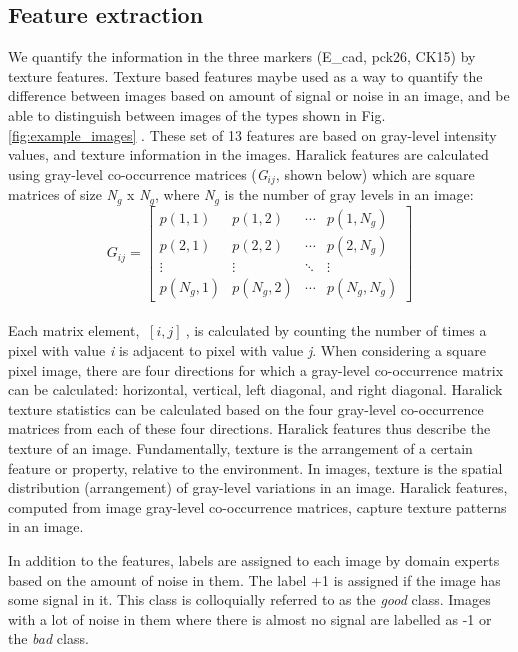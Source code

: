 \subsection{Feature extraction}

We quantify the information in the three markers (E\_cad, pck26, CK15) by texture features. Texture based features maybe used as a way to quantify the difference between images based on amount of signal or noise in an image, and be able to distinguish between images of the types shown in Fig. \ref{fig:example_images} .  These set of 13 features are based on gray-level intensity values, and texture information \cite{haralick1979statistical, haralick1973textural} in the images. 
Haralick features \cite{Haralick1973} are calculated using gray-level co-occurrence matrices (\textit{G$_{ij}$}, shown below) which are square matrices of size \textit{N$_g$} x \textit{N$_g$}, where \textit{N$_g$} is the number of gray levels in an image:
\\
\begin{equation}
G_{ij}=
  \begin{bmatrix}
    p(1,1) & p(1,2) & \cdots       & p(1,N_{g}) \\
    p(2,1) & p(2,2) &  \cdots      & p(2,N_{g}) \\
     \vdots &  \vdots &  \ddots    &  \vdots          \\
    p(N_{g},1)  & p(N_{g},2) & \cdots & p(N_{g},N_{g}) 
  \end{bmatrix}
\end{equation}
\\
Each matrix element, $ \ [i,j]\ $, is calculated by counting the number of times a pixel with value \textit{i} is adjacent to pixel with value \textit{j}.  When considering a square pixel image, there are four directions for which a gray-level co-occurrence matrix can be calculated: horizontal, vertical, left diagonal, and right diagonal.  Haralick texture statistics can be calculated based on the four gray-level co-occurrence matrices from each of these four directions. Haralick features thus describe the texture of an image. Fundamentally, texture is the arrangement of a certain feature or property, relative to the environment. In images, texture is the spatial distribution (arrangement) of gray-level variations in an image. Haralick features, computed from image gray-level co-occurrence matrices, capture texture patterns in an image. 

In addition to the features, labels are assigned to each image by domain experts based on the amount of noise in them. The label +1 is assigned if the image has some signal in it. This class is colloquially referred to as the \textit{good} class.  Images with a lot of noise in them where there is almost no signal are labelled as -1 or the \textit{bad} class.

